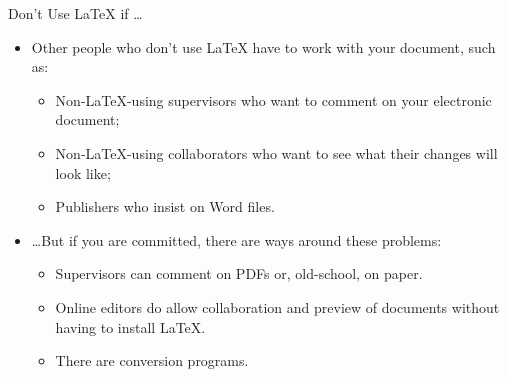 \begin{frame}[fragile]{Don't Use \LaTeX{} if \dots}

\begin{itemize}
\item Other people who don't use \LaTeX{} have to work with your document, such as:
\begin{itemize}
\item Non-\LaTeX-using supervisors who want to comment on your 
electronic document;
\item Non-\LaTeX-using collaborators who want to see what their 
changes will look like;
\item {\color{red} Publishers who insist on Word files.}
\end{itemize}
\item \dots But if you are committed, there are ways around these problems:
\begin{itemize}
\item Supervisors can comment on PDFs or, old-school, on paper.
\item Online editors do allow collaboration and preview of documents
  without having to install \LaTeX.
\item There are conversion programs.
\end{itemize}
\end{itemize}

\end{frame}

